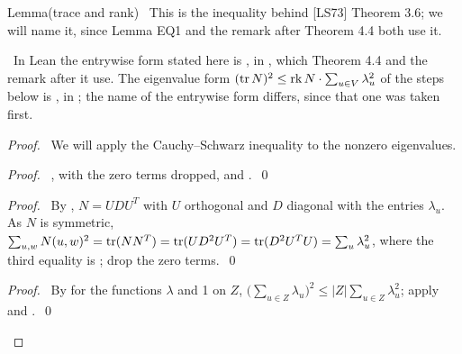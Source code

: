 \begin{namedresult}{Lemma}{(trace and rank)}\label{lem:4-tracerank}
 \new\ This is the inequality behind [LS73] Theorem 3.6; we will name it, since Lemma EQ1 and the
 remark after Theorem 4.4 both use it.
 \begingroup\raggedright\new\ In Lean the entrywise form stated here is
 , in
 , which Theorem 4.4 and the remark after it use.
 The eigenvalue form $(\mathop{\mathrm{tr}}\nolimits N)^2\le\mathop{\mathrm{rk}}\nolimits N\cdot\sum_{u\in V}\lambda_u^2$ of the steps below is
 , in
 ; the name of the entrywise form differs, since
 that one was taken first.\par\endgroup
\end{namedresult}
\begin{proof}
 \pfsketch\ We will apply the Cauchy--Schwarz inequality to the nonzero eigenvalues.
 \begin{proof}\pf\ , with the zero terms
  dropped, and .~\qed\end{proof}
 \begin{proof}\pf\ By , $N=UDU^T$ with $U$ orthogonal
  and $D$ diagonal with the entries $\lambda_u$. As $N$ is symmetric,
  $\sum_{u,w}N(u,w)^2=\mathop{\mathrm{tr}}\nolimits(NN^T)=\mathop{\mathrm{tr}}\nolimits(UD^2U^T)=\mathop{\mathrm{tr}}\nolimits(D^2U^TU)=\sum_u\lambda_u^2$, where the third
  equality is ; drop the zero terms.~\qed\end{proof}
 \qedstep
 \begin{proof}\pf\ By  for the functions $\lambda$ and 1 on
  $Z$, $\bigl(\sum_{u\in Z}\lambda_u\bigr)^2\le|Z|\sum_{u\in Z}\lambda_u^2$; apply
   and .~\qed\end{proof}
\end{proof}

